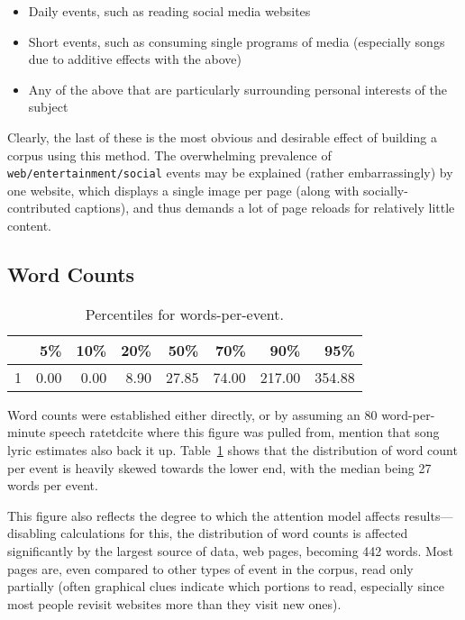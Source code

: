 \begin{itemize}
    \item Daily events, such as reading social media websites
    \item Short events, such as consuming single programs of media (especially songs due to additive effects with the above)
    \item Any of the above that are particularly surrounding personal interests of the subject
\end{itemize}

Clearly, the last of these is the most obvious and desirable effect of building a corpus using this method.  The overwhelming prevalence of \texttt{web/entertainment/social} events may be explained (rather embarrassingly) by one website, which displays a single image per page (along with socially-contributed captions), and thus demands a lot of page reloads for relatively little content.








\subsection{Word Counts}

\begin{table}[ht]
    \centering
    \begin{tabular}{rrrrrrrr}
        \hline
        & 5\% & 10\% & 20\% & 50\% & 70\% & 90\% & 95\% \\ 
        \hline
        1 & 0.00 & 0.00 & 8.90 & 27.85 & 74.00 & 217.00 & 354.88 \\ 
        \hline
    \end{tabular}
    \caption{Percentiles for words-per-event.}
    \label{table:personal:wordsperevent}
\end{table}

Word counts were established either directly, or by assuming an 80 word-per-minute speech ratetd{cite where this figure was pulled from, mention that song lyric estimates also back it up}.  Table~\ref{table:personal:wordsperevent} shows that the distribution of word count per event is heavily skewed towards the lower end, with the median being 27 words per event.

This figure also reflects the degree to which the attention model affects results---disabling calculations for this, the distribution of word counts is affected significantly by the largest source of data, web pages, becoming 442 words.  Most pages are, even compared to other types of event in the corpus, read only partially (often graphical clues indicate which portions to read, especially since most people revisit websites more than they visit new ones).









